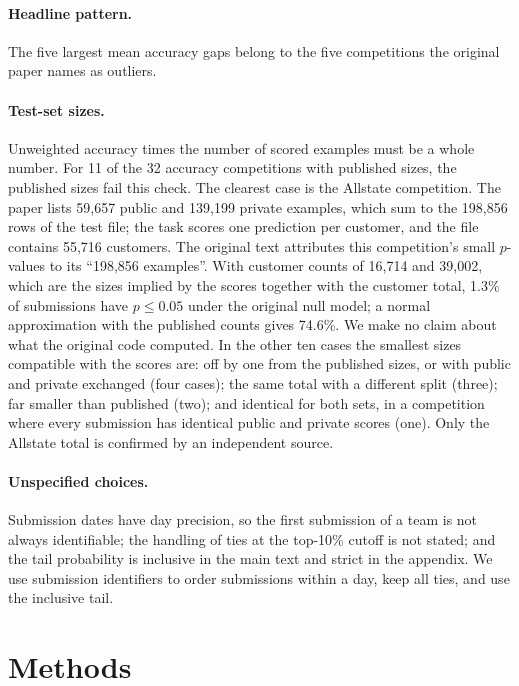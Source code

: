 \documentclass[10pt]{article}
\begin{document}
\paragraph{Headline pattern.} The five largest mean accuracy gaps belong to the five competitions the original paper names as outliers.

\paragraph{Test-set sizes.} Unweighted accuracy times the number of scored examples must be a whole number. For 11 of the 32 accuracy competitions with published sizes, the published sizes fail this check. The clearest case is the Allstate competition. The paper lists 59,657 public and 139,199 private examples, which sum to the 198,856 rows of the test file; the task scores one prediction per customer, and the file contains 55,716 customers. The original text attributes this competition's small $p$-values to its ``198,856 examples''. With customer counts of 16,714 and 39,002, which are the sizes implied by the scores together with the customer total, 1.3\% of submissions have $p \le 0.05$ under the original null model; a normal approximation with the published counts gives 74.6\%. We make no claim about what the original code computed. In the other ten cases the smallest sizes compatible with the scores are: off by one from the published sizes, or with public and private exchanged (four cases); the same total with a different split (three); far smaller than published (two); and identical for both sets, in a competition where every submission has identical public and private scores (one). Only the Allstate total is confirmed by an independent source.

\paragraph{Unspecified choices.} Submission dates have day precision, so the first submission of a team is not always identifiable; the handling of ties at the top-10\% cutoff is not stated; and the tail probability is inclusive in the main text and strict in the appendix. We use submission identifiers to order submissions within a day, keep all ties, and use the inclusive tail.

\section{Methods}
\label{sec:methods}
\end{document}
